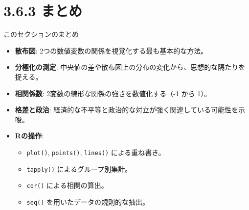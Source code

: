 \documentclass[
  ignorenonframetext,
]{beamer}
\providecommand{\tightlist}{%
  \setlength{\itemsep}{0pt}\setlength{\parskip}{0pt}}
\begin{document}
\hypertarget{ux307eux3068ux3081}{%
\section{3.6.3 まとめ}\label{ux307eux3068ux3081}}

\begin{frame}[fragile]{このセクションのまとめ}
\protect\hypertarget{ux3053ux306eux30bbux30afux30b7ux30e7ux30f3ux306eux307eux3068ux3081}{}
\begin{itemize}
\tightlist
\item
  \textbf{散布図}: 2つの数値変数の関係を視覚化する最も基本的な方法。
\item
  \textbf{分極化の測定}:
  中央値の差や散布図上の分布の変化から、思想的な隔たりを捉える。
\item
  \textbf{相関係数}: 2変数の線形な関係の強さを数値化する（-1 から 1）。
\item
  \textbf{格差と政治}:
  経済的な不平等と政治的な対立が強く関連している可能性を示唆。
\item
  \textbf{Rの操作}:

  \begin{itemize}
  \tightlist
  \item
    \texttt{plot()}, \texttt{points()}, \texttt{lines()}
    による重ね書き。
  \item
    \texttt{tapply()} によるグループ別集計。
  \item
    \texttt{cor()} による相関の算出。
  \item
    \texttt{seq()} を用いたデータの規則的な抽出。
  \end{itemize}
\end{itemize}
\end{frame}
\end{document}
